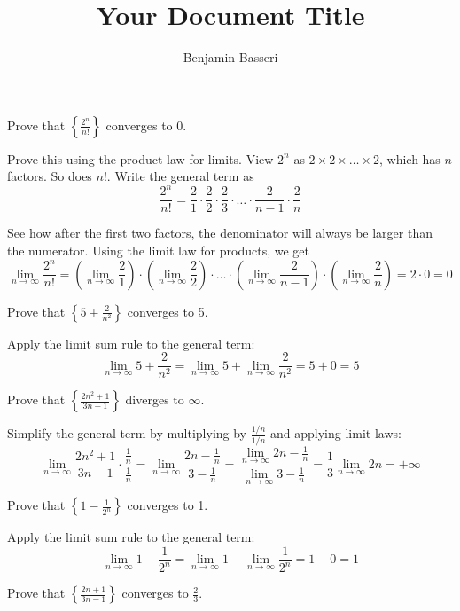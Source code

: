\documentclass{article}
\title{Your Document Title}
\author{Benjamin Basseri}
\begin{document}
\maketitle
\begin{problem}
Prove that $\left\{ \frac{2^n}{n!} \right\}$ converges to 0.
\end{problem}

Prove this using the product law for limits. View $2^n$ as $2 \times 2 \times \ldots \times 2$, which has $n$ factors. So does $n!$. Write the general term as
$$\frac{2^n}{n!} = \frac{2}{1} \cdot \frac{2}{2} \cdot \frac{2}{3} \cdot \ldots \cdot \frac{2}{n-1} \cdot \frac{2}{n}$$

See how after the first two factors, the denominator will always be larger than the numerator. Using the limit law for products, we get
$$\lim_{n\to\infty}\frac{2^n}{n!} = \left(\lim_{n\to\infty}\frac{2}{1}\right) \cdot \left(\lim_{n\to\infty}\frac{2}{2}\right) \cdot \ldots \cdot \left(\lim_{n\to\infty} \frac{2}{n-1}\right) \cdot \left(\lim_{n\to\infty}\frac{2}{n}\right) = 2 \cdot 0 = 0$$

\begin{problem}
Prove that $\left\{5 + \frac{2}{n^2}\right\}$ converges to 5.
\end{problem}

Apply the limit sum rule to the general term:
$$\lim_{n\to\infty} 5 + \frac{2}{n^2} = \lim_{n\to\infty} 5 + \lim_{n\to\infty} \frac{2}{n^2} = 5 + 0 = 5$$

\begin{problem}
Prove that $\left\{ \frac{2n^2 + 1}{3n - 1} \right\}$ diverges to $\infty$.
\end{problem}

Simplify the general term by multiplying by $\frac{1/n}{1/n}$ and applying limit laws:
$$\lim_{n\to\infty} \frac{2n^2 + 1}{3n - 1}\cdot \frac{ \frac{1}{n}}{\frac{1}{n}} = \lim_{n\to\infty} \frac{2n - \frac{1}{n}}{3 - \frac{1}{n}} = \frac{\lim\limits_{n\to\infty}2n - \frac{1}{n}}{\lim\limits_{n\to\infty} 3 - \frac{1}{n}} = \frac{1}{3}\lim_{n\to\infty} 2n = +\infty$$

\begin{problem}
Prove that $\left\{ 1 - \frac{1}{2^n} \right\}$ converges to 1.
\end{problem}

Apply the limit sum rule to the general term:
$$\lim_{n\to\infty} 1 - \frac{1}{2^n} = \lim_{n\to\infty} 1 - \lim_{n\to\infty} \frac{1}{2^n} = 1 - 0 = 1$$

\begin{problem}
Prove that $\left\{ \frac{2n + 1}{3n - 1} \right\}$ converges to $\frac{2}{3}$.
\end{problem}
\end{document}

